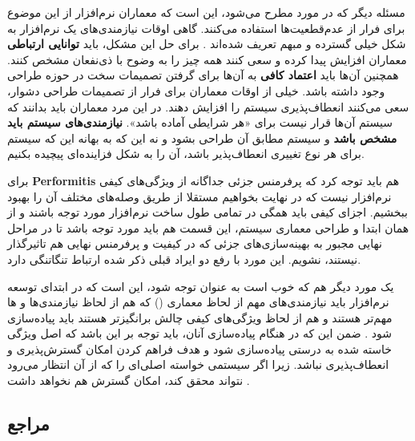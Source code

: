 {\begin{enumerate}[a)]
 مسئله دیگر که در مورد  مطرح می‌شود، این است که معماران نرم‌‌افزار از این موضوع برای فرار از عدم‌قطعیت‌ها استفاده می‌کنند. گاهی اوقات نیازمندی‌های یک نرم‌افزار به شکل خیلی گسترده و مبهم تعریف شده‌اند \cite{buschmann2}. برای حل این مشکل،‌ باید \textbf{توانایی ارتباطی} معماران افزایش پیدا کرده و سعی کنند همه چیز را به وضوح با ذی‌نفعان مشخص کنند. همچنین آن‌ها باید \textbf{اعتماد کافی} به آن‌ها برای گرفتن تصمیمات سخت در حوزه طراحی وجود داشته باشد. خیلی از اوقات معماران برای فرار از تصمیمات طراحی دشوار، سعی می‌کنند انعطاف‌پذیری سیستم را افزایش دهند. \cite{Henny} در این مرد معماران باید بدانند که سیستم آن‌ها قرار نیست برای «هر شرایطی آماده باشد». \textbf{نیازمندی‌های سیستم باید مشخص باشد} و سیستم مطابق آن طراحی بشود و نه این که به بهانه این که سیستم برای هر نوع تغییری انعطاف‌پذیر باشد، آن‌ را به شکل فزاینده‌ای پیچیده بکنیم.
 
 برای \textbf{Performitis} هم باید توجه کرد که پرفرمنس جزئی جداگانه از ویژگی‌های کیفی نرم‌افزار نیست که در نهایت بخواهیم مستقلا از طریق وصله‌های مختلف آن را بهبود ببخشیم. اجزای کیفی باید همگی در تمامی طول ساخت نرم‌افزار مورد توجه باشند و از همان ابتدا و طراحی معماری سیستم، این قسمت‌ هم باید مورد توجه باشد تا در مراحل نهایی مجبور به بهینه‌سازی‌های جزئی که در کیفیت و پرفرمنس نهایی هم تاثیرگذار نیستند،‌ نشویم. این مورد با رفع دو ایراد قبلی ذکر شده ارتباط تنگاتنگی دارد. \cite{buschmann}
 
 
 یک مورد دیگر هم که خوب است به عنوان توجه شود، این است که در ابتدای توسعه نرم‌افزار باید نیازمندی‌های مهم از لحاظ معماری () که هم از لحاظ نیازمندی‌ها و  ها مهم‌تر هستند و هم از لحاظ ویژگی‌های کیفی چالش برانگیز‌تر هستند باید پیاده‌سازی شود \cite{Pohl,Weiss}. ضمن این که در هنگام پیاده‌سازی آنان، باید توجه بر این باشد که اصل ویژگی خاسته شده به درستی پیاده‌سازی شود و هدف فراهم کردن امکان گسترش‌پذیری و انعطاف‌پذیری نباشد. زیرا اگر سیستمی خواسته اصلی‌ای را که از آن انتظار می‌رود نتواند محقق کند، امکان گسترش هم نخواهد داشت \cite{Czarnecki}.
 
 
\end{enumerate}
	

\subsection*{مراجع}

\begin{latin}
	\begingroup
	\renewcommand{\section}[2]{}%
	

\end{latin}}
